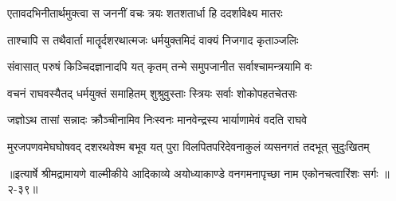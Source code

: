 \twolineshloka
{एतावदभिनीतार्थमुक्त्वा स जननीं वचः}
{त्रयः शतशतार्धा हि ददर्शावेक्ष्य मातरः} %

\twolineshloka
{ताश्चापि स तथैवार्ता मातॄर्दशरथात्मजः}
{धर्मयुक्तमिदं वाक्यं निजगाद कृताञ्जलिः} %

\twolineshloka
{संवासात् परुषं किञ्चिदज्ञानादपि यत् कृतम्}
{तन्मे समुपजानीत सर्वाश्चामन्त्रयामि वः} %

\twolineshloka
{वचनं राघवस्यैतद् धर्मयुक्तं समाहितम्}
{शुश्रुवुस्ताः स्त्रियः सर्वाः शोकोपहतचेतसः} %

\twolineshloka
{जज्ञोऽथ तासां सन्नादः क्रौञ्चीनामिव निःस्वनः}
{मानवेन्द्रस्य भार्याणामेवं वदति राघवे} %

\twolineshloka
{मुरजपणवमेघघोषवद् दशरथवेश्म बभूव यत् पुरा}
{विलपितपरिदेवनाकुलं व्यसनगतं तदभूत् सुदुःखितम्} %


॥इत्यार्षे श्रीमद्रामायणे वाल्मीकीये आदिकाव्ये अयोध्याकाण्डे वनगमनापृच्छा नाम एकोनचत्वारिंशः सर्गः ॥२-३९॥
